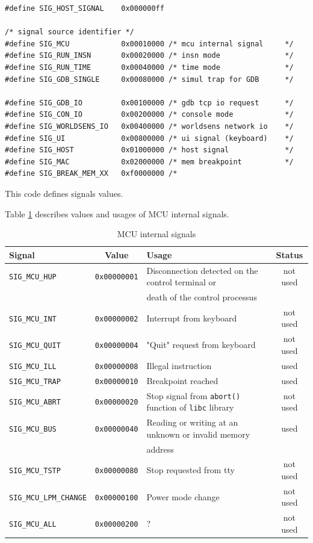 \documentclass[a4paper,10pt]{report}
\begin{document}
\begin{verbatim}
#define SIG_HOST_SIGNAL    0x000000ff

/* signal source identifier */
#define SIG_MCU            0x00010000 /* mcu internal signal     */
#define SIG_RUN_INSN       0x00020000 /* insn mode               */
#define SIG_RUN_TIME       0x00040000 /* time mode               */
#define SIG_GDB_SINGLE     0x00080000 /* simul trap for GDB      */

#define SIG_GDB_IO         0x00100000 /* gdb tcp io request      */
#define SIG_CON_IO         0x00200000 /* console mode            */
#define SIG_WORLDSENS_IO   0x00400000 /* worldsens network io    */
#define SIG_UI             0x00800000 /* ui signal (keyboard)    */
#define SIG_HOST           0x01000000 /* host signal             */
#define SIG_MAC            0x02000000 /* mem breakpoint          */
#define SIG_BREAK_MEM_XX   0xf0000000 /*                 
\end{verbatim}

This code defines signals values.

Table \ref{mcu-signals} describes values and usages of MCU internal signals.
\begin{table}[!h]
    \begin{center}
    \begin{tabular}{|l|c|l|c|}
    \hline
      \rowcolor[gray]{0.9} \textbf{Signal} & \textbf{Value} & \textbf{Usage} & \textbf{Status} \\
    \hline
      \verb$SIG_MCU_HUP$ & \verb$0x00000001$ & Disconnection detected on the control terminal or & not used \\
      &  & death of the control processus & \\
    \hline
      \verb$SIG_MCU_INT$ & \verb$0x00000002$ & Interrupt from keyboard & not used \\
    \hline
      \verb$SIG_MCU_QUIT$ & \verb$0x00000004$ & "Quit" request from keyboard & not used \\
    \hline
      \verb$SIG_MCU_ILL$ & \verb$0x00000008$ & Illegal instruction & used\\
    \hline
      \verb$SIG_MCU_TRAP$ & \verb$0x00000010$ & Breakpoint reached & used\\
    \hline
      \verb$SIG_MCU_ABRT$ & \verb$0x00000020$ & Stop signal from \verb$abort()$ function of \verb$libc$ library & not used\\
    \hline
      \verb$SIG_MCU_BUS$ & \verb$0x00000040$ & Reading or writing at an unknown or invalid memory & used \\
      &  & address & \\
    \hline
      \verb$SIG_MCU_TSTP$ & \verb$0x00000080$ & Stop requested from tty & not used\\
    \hline
      \verb$SIG_MCU_LPM_CHANGE$ & \verb$0x00000100$ & Power mode change & not used\\
    \hline
      \verb$SIG_MCU_ALL$ & \verb$0x00000200$ & ? & not used\\
    \hline
    \end{tabular}
    \end{center}
    \caption{MCU internal signals}
    \label{mcu-signals}
\end{table}
\end{document}
